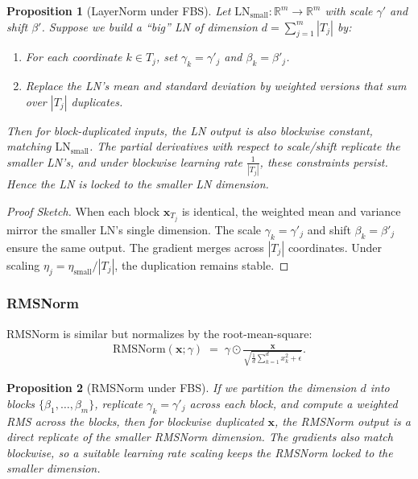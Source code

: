 \documentclass[11pt]{article}
\newtheorem{proposition}{Proposition}[section]
\begin{document}
\begin{proposition}[LayerNorm under FBS]
\label{prop:LN_FBS}
Let $\mathrm{LN}_{\text{small}}\colon \mathbb{R}^{m}\to\mathbb{R}^{m}$ with scale $\gamma'$ and shift $\beta'$. Suppose we build a ``big'' LN of dimension $d=\sum_{j=1}^m |T_j|$ by:
\begin{enumerate}
    \item For each coordinate $k\in T_j$, set $\gamma_k=\gamma'_j$ and $\beta_k=\beta'_j$.
    \item Replace the LN's mean and standard deviation by weighted versions that sum over $|T_j|$ duplicates.
\end{enumerate}
Then for block-duplicated inputs, the LN output is also blockwise constant, matching $\mathrm{LN}_{\text{small}}$. The partial derivatives with respect to scale/shift replicate the smaller LN's, and under blockwise learning rate $\frac{1}{|T_j|}$, these constraints persist. Hence the LN is locked to the smaller LN dimension.
\end{proposition}

\begin{proof}[Proof Sketch]
When each block $\mathbf{x}_{T_j}$ is identical, the weighted mean and variance mirror the smaller LN's single dimension. The scale $\gamma_k=\gamma'_j$ and shift $\beta_k=\beta'_j$ ensure the same output. The gradient merges across $|T_j|$ coordinates. Under scaling $\eta_{j} = \eta_{\text{small}} / |T_j|$, the duplication remains stable.
\end{proof}

\subsubsection{RMSNorm}
RMSNorm is similar but normalizes by the root-mean-square:
\begin{align*}
  \mathrm{RMSNorm}(\mathbf{x};\gamma)
  \;=\;
  \gamma \odot \frac{\mathbf{x}}{\sqrt{\tfrac{1}{d}\sum_{k=1}^d x_k^2 + \epsilon}}.
\end{align*}

\begin{proposition}[RMSNorm under FBS]
\label{prop:RMS_FBS}
If we partition the dimension $d$ into blocks $\{\beta_1,\dots,\beta_m\}$, replicate $\gamma_k=\gamma'_j$ across each block, and compute a weighted RMS across the blocks, then for blockwise duplicated $\mathbf{x}$, the RMSNorm output is a direct replicate of the smaller RMSNorm dimension. The gradients also match blockwise, so a suitable learning rate scaling keeps the RMSNorm locked to the smaller dimension.
\end{proposition}
\end{document}
